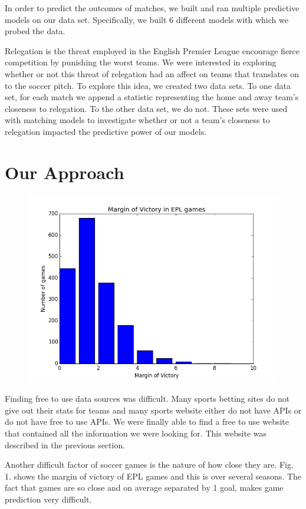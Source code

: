 \documentclass[conference]{IEEEtran}
\begin{document}
In order to predict the outcomes of matches, we built and ran multiple predictive   models on our data set. Specifically, we built 6 different models with which we probed  the data. 

Relegation is the threat employed in the English Premier League encourage fierce    competition by punishing the worst teams.  We were interested in exploring whether or   not this threat of relegation had an affect on teams that translates on to the soccer   pitch. To explore this idea, we created two data sets. To one data set, for each match  we append a statistic representing the home and away team's closeness to relegation. To the other data set, we do not. These sets were used with matching models to investigate whether or not a team's closeness to relegation impacted the predictive power of our    models.
\section{Our Approach}
\begin{figure}[b]
\centering
\includegraphics[width=0.7\linewidth]{MarginOfVictory}
\caption{}
\label{fig:MarginOfVictory}
\end{figure}


Finding free to use data sources was difficult. Many sports betting sites do not give out their stats for teams and many sports website either do not have APIs or do not have free to use APIs. We were finally able to find a free to use website that contained all the information we were looking for. This website was described in the previous section.

Another difficult factor of soccer games is the nature of how close they are. Fig. 1. shows the margin of victory of EPL games and this is over several seasons. The fact that games are so close and on average separated by 1 goal, makes game prediction very difficult.
\end{document}
